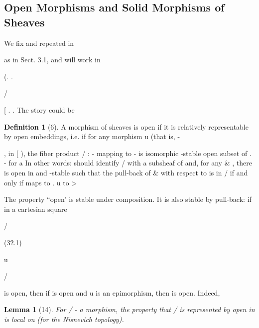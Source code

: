 \documentclass[11pt,a4paper]{article}
\theoremstyle{plain}
\newtheorem{lemma}[theorem]{Lemma}
\theoremstyle{definition}
\newtheorem{definition}[theorem]{Definition}
\begin{document}
\subsection{Open Morphisms and Solid Morphisms of Sheaves}




We fix and
repeated in

as in Sect. 3.1, and will work in

(.   .

 /

[ .   . The story could be

\begin{definition}[6]
A morphism of sheaves
is open if it is relatively representable by open embeddings, i.e. if for any morphism u
(that is,
-



,  in [ ), the fiber product / : - mapping to - is isomorphic
-stable open subset of  .
- for  a
In other words:  should identify / with a subsheaf of and, for any \&  ,
there is  open in  and -stable such that the pull-back of \& with respect to
  is in /  if and only if  maps to  .
u
to >

The property ``open' is stable under composition. It is also stable by pull-back:
if in a cartesian square


/  









(32.1)

u

/ 

 is open, then 
if   is open and u is an epimorphism, then  is open. Indeed,
\end{definition}

\begin{lemma}[14]
For /
- a morphism, the property that / is represented by 
open in  is local on  (for the Nisnevich topology).
\end{lemma}
\end{document}

